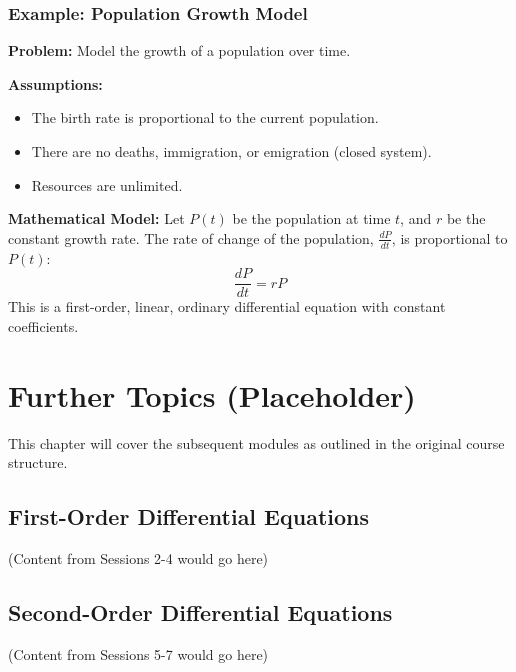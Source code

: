 \documentclass[12pt, letterpaper]{book}
\begin{document}
\subsection{Example: Population Growth Model}
\label{ssec:example_population_growth}
\textbf{Problem:} Model the growth of a population over time.

\textbf{Assumptions:}
\begin{itemize}
    \item The birth rate is proportional to the current population.
    \item There are no deaths, immigration, or emigration (closed system).
    \item Resources are unlimited.
\end{itemize}

\textbf{Mathematical Model:}
Let $P(t)$ be the population at time $t$, and $r$ be the constant growth rate.
The rate of change of the population, $\frac{dP}{dt}$, is proportional to $P(t)$:
\begin{equation}
    \frac{dP}{dt} = rP \label{eq:population_growth}
\end{equation}
This is a first-order, linear, ordinary differential equation with constant coefficients.

\chapter{Further Topics (Placeholder)}
\label{chap:further_topics}
This chapter will cover the subsequent modules as outlined in the original course structure.

\section{First-Order Differential Equations}
(Content from Sessions 2-4 would go here)

\section{Second-Order Differential Equations}
(Content from Sessions 5-7 would go here)


\appendix
\end{document}
